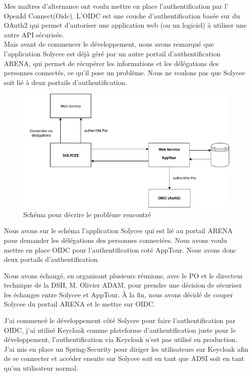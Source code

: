 \documentclass[12pt]{article}
\begin{document}
Mes maîtres d'alternance ont voulu mettre en place l'authentification par l' OpenId Connect(Oidc). L'OIDC est une couche d'authentification basée sur du OAuth2 qui permet d'autoriser une application web (ou un logiciel) à utiliser une autre API sécurisée. \\

Mais avant de commencer le développement, nous avons remarqué que l'application Solycee est déjà géré par un autre portail d'authentification ARENA, qui permet de récupérer les informations et les délégations des personnes connectés, ce qu'il pose un problème. Nous ne voulons pas que Solycee soit lié à deux portails d'authentification.

\begin{figure}[H]
	\centering
 		\includegraphics[width=1\textwidth]{diagrammes/schemaOIDC.png}
  		\caption{Schéma pour décrire le problème rencontré}\end{figure}	

Nous avons sur le schéma l'application Solycee qui est lié au portail ARENA pour demander les délégations des personnes connectées. Nous avons voulu mettre en place OIDC pour l'authentification coté AppTour. Nous avons donc deux portails d'authentification. 


Nous avons échangé, en organisant plusieurs réunions, avec le PO et le directeur technique de la DSII, M. Olivier ADAM, pour prendre une décision de sécuriser les échanges entre  Solycee et AppTour. À la fin, nous avons décidé de couper Solycee du portail ARENA et le mettre sur OIDC. 

J'ai commencé le développement côté Solycee pour faire l'authentification par OIDC, j'ai utilisé Keycloak comme plateforme d'authentification juste pour le développement, l'authentification via Keycloak n'est pas utilisé en production. J'ai mis en place un Spring-Security pour diriger les utilisateurs sur Keycloak afin de se connecter et accéder ensuite sur Solycee soit en tant que ADSI soit en tant qu'un utilisateur normal. 
\end{document}
